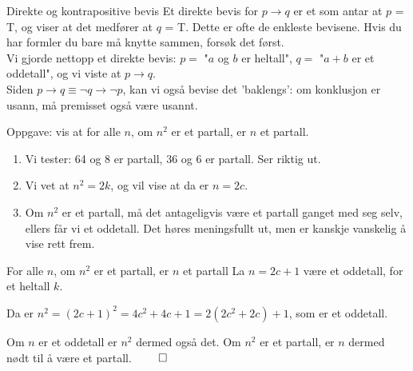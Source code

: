 \begin{frame}{Direkte og kontrapositive bevis}
    Et direkte bevis for $p \rightarrow q$ er et som antar at $p$ = T, og viser at det medfører at $q$ = T.
    Dette er ofte de enkleste bevisene. Hvis du har formler du bare må knytte sammen, forsøk det først.\\

    \pause
    Vi gjorde nettopp et direkte bevis: $p =$ "$a$ og $b$ er heltall", $q =$ "$a+b$ er et oddetall", og vi viste at $p \rightarrow q$.\\

    \pause
    Siden $p \rightarrow q \equiv \lnot q \rightarrow \lnot p$, kan vi også bevise det 'baklengs': om konklusjon er usann, må premisset også være usannt.
\end{frame}

\begin{frame}{Oppgave: vis at for alle $n$, om $n^2$ er et partall, er $n$ et partall.}
    \begin{enumerate}
        \pause
        \item Vi tester: 64 og 8 er partall, 36 og 6 er partall. Ser riktig ut.
        \pause
        \item Vi vet at $n^2 = 2k$, og vil vise at da er $n = 2c$.
        \pause
        \item Om $n^2$ er et partall, må det antageligvis være et partall ganget med seg selv, ellers får vi et oddetall. Det høres meningsfullt ut, men er kanskje vanskelig å vise rett frem.
    \end{enumerate}

    \pause
    \begin{block}{For alle $n$, om $n^2$ er et partall, er $n$ et partall}
        La $n = 2c + 1$ være et oddetall, for et heltall $k$.

        \pause
        Da er $n^2 = (2c + 1)^2 = 4c^2 + 4c + 1 = 2(2c^2 + 2c) + 1$, som er et oddetall.

        \pause
        Om $n$ er et oddetall er $n^2$ dermed også det. Om $n^2$ er et partall, er $n$ dermed nødt til å være et partall. $\qed$
    \end{block}
\end{frame}


